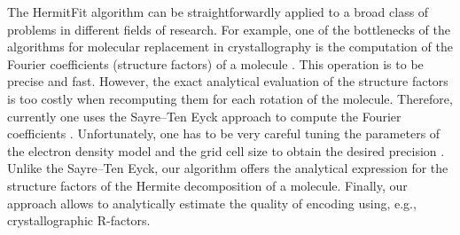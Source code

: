The HermitFit algorithm can be straightforwardly applied to a broad class of problems in different fields of research.
For example, one of the bottlenecks of the algorithms for molecular replacement in crystallography is the
computation of the Fourier coefficients (structure factors) of a molecule \cite{navaza1995fast}. 
This operation is to be precise and fast. However, the exact analytical evaluation 
of the structure factors is too costly \cite{sayre1951calculation} when recomputing them for each rotation of the molecule. 
Therefore, currently one uses the Sayre--Ten Eyck approach to compute the Fourier 
coefficients \cite{ten1977efficient}. Unfortunately, one has to be very careful tuning the parameters of the electron density model and
the grid cell size to obtain the desired precision \cite{navaza2002computation,afonine2003fast}.
Unlike the Sayre--Ten Eyck, our algorithm offers the analytical expression for the structure factors of the Hermite decomposition of a molecule.
%
Finally, our approach  allows to analytically estimate the quality of encoding using, e.g., crystallographic R-factors.